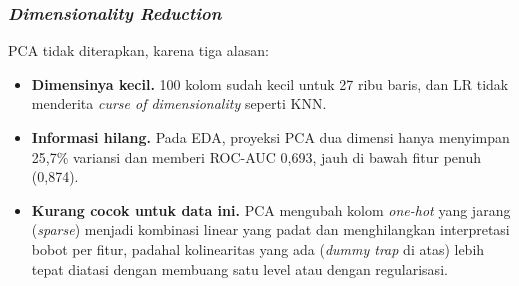 \subsubsection{\textit{Dimensionality Reduction}}
PCA tidak diterapkan, karena tiga alasan:
\begin{itemize}
	\item \textbf{Dimensinya kecil.} 100 kolom sudah kecil untuk 27 ribu baris, dan LR tidak menderita \textit{curse of dimensionality} seperti KNN.
	\item \textbf{Informasi hilang.} Pada EDA, proyeksi PCA dua dimensi hanya menyimpan 25,7\% variansi dan memberi ROC-AUC 0,693, jauh di bawah fitur penuh (0,874).
	\item \textbf{Kurang cocok untuk data ini.} PCA mengubah kolom \textit{one-hot} yang jarang (\textit{sparse}) menjadi kombinasi linear yang padat dan menghilangkan interpretasi bobot per fitur, padahal kolinearitas yang ada (\textit{dummy trap} di atas) lebih tepat diatasi dengan membuang satu level atau dengan regularisasi.
\end{itemize}
